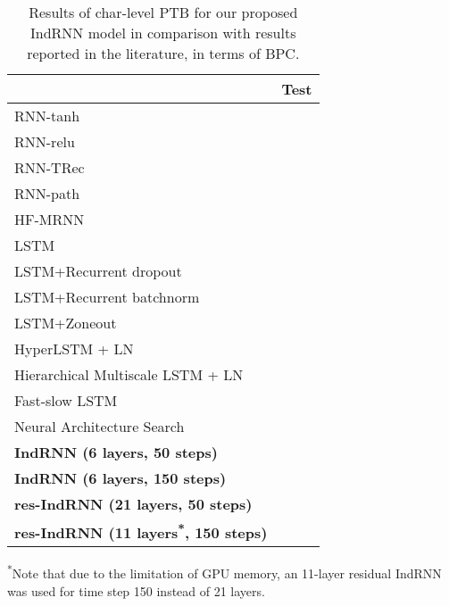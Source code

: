 \documentclass[10pt,twocolumn,letterpaper]{article}
\begin{document}
\begin{table}
\centering
\tabcolsep=12pt
\caption{Results of char-level PTB for our proposed IndRNN model in comparison with results reported in the literature, in terms of BPC.}\label{result_penntree}
\begin{threeparttable}
  \begin{tabular}{l c}
  \hline
   & Test \\
  \hline
  RNN-tanh \cite{krueger2016regularizing} &  \\
  RNN-relu \cite{neyshabur2016path} &   \\
  RNN-TRec \cite{krueger2016regularizing} &  \\
  RNN-path \cite{neyshabur2016path} &  \\
  HF-MRNN \cite{mikolov2012subword} &  \\ 
  LSTM \cite{krueger2016zoneout}  &  \\
  LSTM+Recurrent dropout \cite{semeniuta2016recurrent} &  \\  
  LSTM+Recurrent batchnorm \cite{cooijmans2016recurrent} &  \\
  LSTM+Zoneout \cite{krueger2016zoneout} &   \\
  HyperLSTM + LN \cite{ha2016hypernetworks} &  \\
  Hierarchical Multiscale LSTM + LN \cite{chung2016hierarchical} &  \\
  Fast-slow LSTM \cite{mujika2017fast} &  \\
  Neural Architecture Search \cite{zoph2016neural} &  \\
  \hline  
  \textbf{IndRNN (6 layers, 50 steps)} &  \\
  \hline 
  \textbf{IndRNN (6 layers, 150 steps)} &  \\
  \hline 
  \textbf{res-IndRNN (21 layers, 50 steps)} &  \\
  \hline  
  \textbf{res-IndRNN (11 layers\textsuperscript{*}, 150 steps)} &  \\
  \hline
  \end{tabular}
      \begin{tablenotes}
      \small
      \item \textsuperscript{*}Note that due to the limitation of GPU memory, an 11-layer residual IndRNN was used for time step 150 instead of 21 layers.
    \end{tablenotes}
\label{result_final}
\end{threeparttable}
\end{table}
\end{document}
